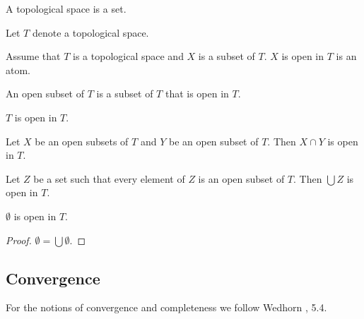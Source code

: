 \documentclass[english,11pt]{article}
\begin{document}
\begin{forthel}

\begin{signature}
A topological space is a set.
\end{signature}

Let $T$ denote a topological space.

\begin{signature} Assume that $T$ is a topological space and $X$ is a subset of $T$.
$X$ is open in $T$ is an atom.
\end{signature}

\begin{definition}
An open subset of $T$ is a subset of $T$ that is open in $T$.
\end{definition}

\begin{axiom} $T$ is open in $T$. \end{axiom}

\begin{axiom} Let $X$ be an open subsets of $T$ and $Y$ be an open subset of $T$.
Then $X \cap Y$ is open in $T$.
\end{axiom}

\begin{axiom} Let $Z$ be a set such that every element of $Z$
is an open subset of $T$. Then $\bigcup Z$ is open in $T$.
\end{axiom}

\begin{lemma} $\emptyset$ is open in $T$. \end{lemma}
\begin{proof} $\emptyset = \bigcup \emptyset$. \end{proof}

\end{forthel}
\subsection{Convergence}

For the notions of convergence and completeness we follow Wedhorn 
\cite{Wedhhorn2019}, 5.4.
\end{document}
